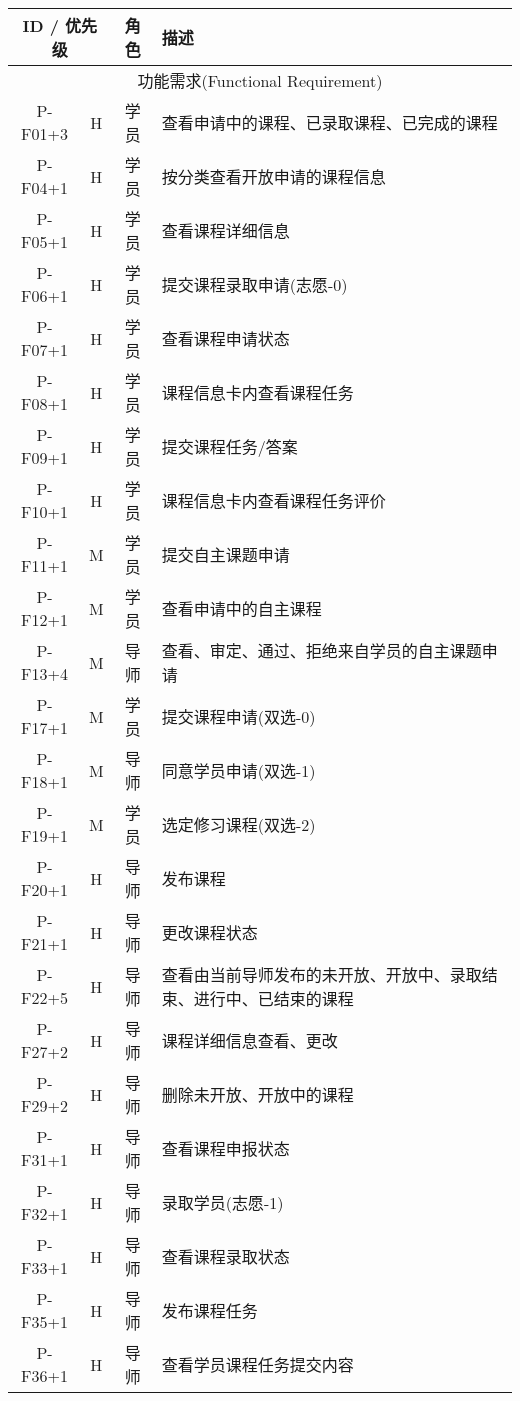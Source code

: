 
\noindent
\begin{longtable}{|c|c|c|X|}
  \hline
  \multicolumn{2}{|c|}{\textbf{ID} / \textbf{优先级}} & \textbf{角色} & \textbf{描述} \\ \hline
  \multicolumn{4}{|c|}{功能需求(Functional Requirement)} \\ \hline
  P-F01+3 & H & 学员 & 查看申请中的课程、已录取课程、已完成的课程 \\ \hline
  P-F04+1 & H & 学员 & 按分类查看开放申请的课程信息 \\ \hline
  P-F05+1 & H & 学员 & 查看课程详细信息 \\ \hline
  P-F06+1 & H & 学员 & 提交课程录取申请(志愿-0) \\ \hline
  P-F07+1 & H & 学员 & 查看课程申请状态 \\ \hline
  P-F08+1 & H & 学员 & 课程信息卡内查看课程任务 \\ \hline
  P-F09+1 & H & 学员 & 提交课程任务/答案 \\ \hline
  P-F10+1 & H & 学员 & 课程信息卡内查看课程任务评价 \\ \hline
  P-F11+1 & M & 学员 & 提交自主课题申请 \\ \hline
  P-F12+1 & M & 学员 & 查看申请中的自主课程 \\ \hline
  P-F13+4 & M & 导师 & 查看、审定、通过、拒绝来自学员的自主课题申请 \\ \hline
  P-F17+1 & M & 学员 & 提交课程申请(双选-0) \\ \hline
  P-F18+1 & M & 导师 & 同意学员申请(双选-1) \\ \hline
  P-F19+1 & M & 学员 & 选定修习课程(双选-2) \\ \hline
  P-F20+1 & H & 导师 & 发布课程 \\ \hline
  P-F21+1 & H & 导师 & 更改课程状态 \\ \hline
  P-F22+5 & H & 导师 & 查看由当前导师发布的未开放、开放中、录取结束、进行中、已结束的课程 \\ \hline
  P-F27+2 & H & 导师 & 课程详细信息查看、更改 \\ \hline
  P-F29+2 & H & 导师 & 删除未开放、开放中的课程 \\ \hline
  P-F31+1 & H & 导师 & 查看课程申报状态 \\ \hline
  P-F32+1 & H & 导师 & 录取学员(志愿-1) \\ \hline
  P-F33+1 & H & 导师 & 查看课程录取状态 \\ \hline
  P-F35+1 & H & 导师 & 发布课程任务 \\ \hline
  P-F36+1 & H & 导师 & 查看学员课程任务提交内容 \\ \hline

\end{longtable}
